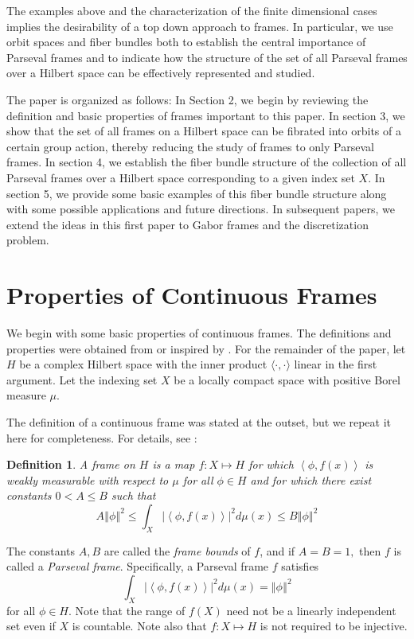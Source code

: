 \documentclass{article}
\newtheorem{defn}{Definition}
\newcommand{\brak}[1]{\langle #1\rangle}
\begin{document}
The examples above and the characterization of the finite dimensional cases implies the desirability of a top down approach to frames.  In particular, we use orbit spaces and fiber bundles both to establish the central importance of Parseval frames and to indicate how the structure of the set of all Parseval frames over a Hilbert space can be effectively represented and studied. 

The paper is organized as follows: In Section 2, we begin by reviewing the definition and basic properties of frames important to this paper. In section 3, we show that the set of all frames on a Hilbert space can be fibrated into orbits of a certain group action, thereby reducing the study of frames to only Parseval frames. In section 4, we establish the fiber bundle structure of the collection of all Parseval frames over a Hilbert space corresponding to a given index set $X$.   In section 5, we provide some basic examples  of this fiber bundle structure along with some possible applications and future directions.  In subsequent papers, we extend the ideas in this first paper to Gabor frames and the discretization problem.  

\section{Properties of Continuous Frames}

We begin with some basic properties of continuous frames. The definitions and properties were obtained from or inspired by \cite{ali2014coherent}. For the remainder of the paper, let $H$ be a complex Hilbert space with the inner product $\brak{\cdot,\cdot}$ linear in the first argument. Let the indexing set $X$ be a locally compact space with positive Borel measure $\mu.$  

The definition of a continuous frame was stated at the outset, but we repeat it here for completeness. For details, see \cite{ali2014coherent, ali1993continuous, heil1989continuous, rahimi2006continuous}:

\begin{defn}
A frame on $H$ is a map $f:X\mapsto H$ for which $\left\langle \phi, f\left( x\right) \right\rangle$ is weakly measurable with respect to $\mu$ for all $\phi \in H$ and for which there exist constants $0<A\leq B$ such that 
$$
A\left\Vert \phi \right\Vert ^{2}\leq \int_{X}\left\vert \left\langle \phi,f\left( x\right) \right\rangle \right\vert ^{2}d\mu \left( x\right) \leq B\left\Vert \phi \right\Vert ^{2} 
$$
\end{defn} 
\noindent The constants $A,B$ are called the \emph{frame bounds} of $f$, and if $A=B=1,$ then $f$ is called a \emph{Parseval frame}. Specifically, a Parseval frame $f$  satisfies 
$$\int_{X}\left\vert \left\langle \phi,f\left( x\right) \right\rangle \right\vert ^{2}d\mu \left( x\right) = \left\Vert \phi \right\Vert ^{2} $$
for all $\phi \in H$.  Note that the range of $f(X)$ need not be a linearly independent set even if $X$ is countable. Note also that $f:X\mapsto H$ is not required to be injective.  
\end{document}
